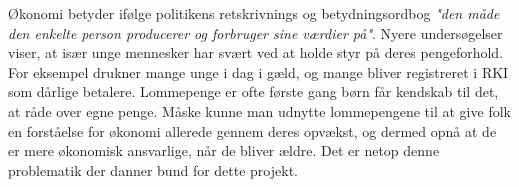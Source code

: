 Økonomi betyder ifølge politikens retskrivnings og betydningsordbog \textit{"den måde den enkelte person producerer og forbruger sine værdier på"}. Nyere undersøgelser viser, at især unge mennesker har svært ved at holde styr på deres pengeforhold. For eksempel drukner mange unge i dag i gæld, og mange bliver registreret i RKI som dårlige betalere.
Lommepenge er ofte første gang børn får kendskab til det, at råde over egne penge. Måske kunne man udnytte lommepengene til at give folk en forståelse for økonomi allerede gennem deres opvækst, og dermed opnå at de er mere økonomisk ansvarlige, 
når de bliver ældre. Det er netop denne problematik der danner bund for dette projekt.

